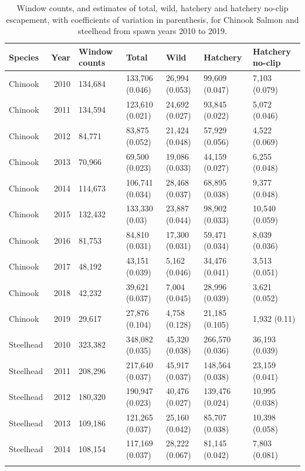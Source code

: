 \documentclass[
  12pt,
]{article}
\begin{document}
\begin{table}

\caption{\label{tab:lgr-tab}Window counts, and estimates of total, wild, hatchery and hatchery no-clip escapement, with coefficients of variation in parenthesis, for Chinook Salmon and steelhead from spawn years 2010 to 2019.}
\centering
\begin{tabular}[t]{lrlllll}
\toprule
Species & Year & Window counts & Total & Wild & Hatchery & Hatchery no-clip\\
\midrule
Chinook & 2010 & 134,684 & 133,706 (0.046) & 26,994 (0.053) & 99,609 (0.047) & 7,103 (0.079)\\
Chinook & 2011 & 134,594 & 123,610 (0.021) & 24,692 (0.027) & 93,845 (0.022) & 5,072 (0.046)\\
Chinook & 2012 & 84,771 & 83,875 (0.052) & 21,424 (0.048) & 57,929 (0.056) & 4,522 (0.069)\\
Chinook & 2013 & 70,966 & 69,500 (0.023) & 19,086 (0.033) & 44,159 (0.027) & 6,255 (0.048)\\
Chinook & 2014 & 114,673 & 106,741 (0.034) & 28,468 (0.037) & 68,895 (0.038) & 9,377 (0.048)\\
\addlinespace
Chinook & 2015 & 132,432 & 133,330 (0.03) & 23,887 (0.044) & 98,902 (0.033) & 10,540 (0.059)\\
Chinook & 2016 & 81,753 & 84,810 (0.031) & 17,300 (0.031) & 59,471 (0.034) & 8,039 (0.036)\\
Chinook & 2017 & 48,192 & 43,151 (0.039) & 5,162 (0.046) & 34,476 (0.041) & 3,513 (0.051)\\
Chinook & 2018 & 42,232 & 39,621 (0.037) & 7,004 (0.045) & 28,996 (0.039) & 3,621 (0.052)\\
Chinook & 2019 & 29,617 & 27,876 (0.104) & 4,758 (0.128) & 21,185 (0.105) & 1,932 (0.11)\\
\addlinespace
Steelhead & 2010 & 323,382 & 348,082 (0.035) & 45,320 (0.038) & 266,570 (0.036) & 36,193 (0.039)\\
Steelhead & 2011 & 208,296 & 217,640 (0.037) & 45,917 (0.037) & 148,564 (0.038) & 23,159 (0.041)\\
Steelhead & 2012 & 180,320 & 190,947 (0.023) & 40,476 (0.027) & 139,476 (0.024) & 10,995 (0.038)\\
Steelhead & 2013 & 109,186 & 121,265 (0.037) & 25,160 (0.042) & 85,707 (0.038) & 10,398 (0.058)\\
Steelhead & 2014 & 108,154 & 117,169 (0.037) & 28,222 (0.067) & 81,145 (0.042) & 7,803 (0.081)\\
\addlinespace

\end{tabular}
\end{table}
\end{document}
